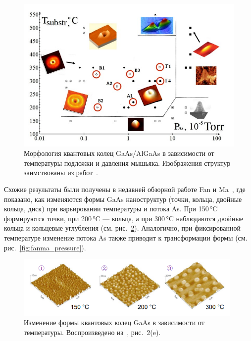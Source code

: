 \documentclass[14pt,oneside]{extarticle}
\begin{document}
\begin{figure}[H]
    \begin{center}
        \includegraphics[width=14cm]{images/morphology_map.png}
        \caption{\label{fig:morph_map}
            Морфология квантовых колец GaAs/AlGaAs в зависимости от температуры подложки и давления мышьяка. Изображения структур заимствованы из работ~\cite{mano2005nano, koguchi2005growth, vasilevskiy2013}.}
    \end{center}
\end{figure}

Схожие результаты были получены в недавней обзорной работе Fan и Ma~\cite{fan2023}, где показано, как изменяются формы GaAs наноструктур (точки, кольца, двойные кольца, диск) при варьировании температуры и потока As. При 150 °C формируются точки, при 200 °C — кольца, а при 300 °C наблюдаются двойные кольца и кольцевые углубления (см. рис.~\ref{fig:fanma_temp}). Аналогично, при фиксированной температуре изменение потока As также приводит к трансформации формы (см. рис.~\ref{fig:fanma_pressure}).

\begin{figure}[H]
    \begin{center}
        \includegraphics[width=11cm]{images/fanma_fig2e_left.png}
        \caption{\label{fig:fanma_temp}
            Изменение формы квантовых колец GaAs в зависимости от температуры. Воспроизведено из~\cite{fan2023}, рис.~2(e).}
    \end{center}
\end{figure}
\end{document}
